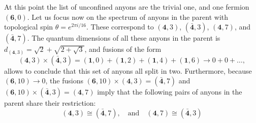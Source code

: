 \documentclass[11pt]{article}
\numberwithin{equation}{section}
\begin{document}
At this point the list of unconfined anyons are the trivial one, and one fermion $(\mathbf{6},0)$. Let us focus now on the spectrum of anyons in the parent with topological spin $\theta = e^{2 \pi i / 16}$. These correspond to $(\mathbf{4},3)$, $(\mathbf{\bar{4}},3)$, $(\mathbf{4},7)$, and $(\mathbf{\bar{4}},7)$. The quantum dimensions of all these anyons in the parent is $d_{(\mathbf{4},3)} = \sqrt{2} + \sqrt{2 + \sqrt{3}}$, and fusions of the form
\begin{equation}
    (\mathbf{4},3) \times (\mathbf{\bar{4}},3) = (\mathbf{1},0) + (\mathbf{1},2) + (\mathbf{1},4) + (\mathbf{1},6) \longrightarrow 0 + 0 + \ldots,
\end{equation}
allows to conclude that this set of anyons all split in two. Furthermore, because $(\mathbf{6},10) \to 0$, the fusions $(\mathbf{6},10) \times (\mathbf{4},3) = (\mathbf{\bar{4}},7)$ and $(\mathbf{6},10) \times (\mathbf{\bar{4}},3) = (\mathbf{4},7)$ imply that the following pairs of anyons in the parent share their restriction:
\begin{equation}
    (\mathbf{4},3) \cong (\mathbf{\bar{4}},7), \quad \mathrm{and} \quad (\mathbf{4},7) \cong (\mathbf{\bar{4}},3)
\end{equation}
\end{document}
